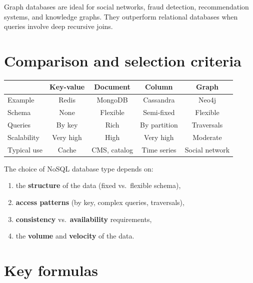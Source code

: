 \begin{remark}
Graph databases are ideal for social networks, fraud detection,
recommendation systems, and knowledge graphs. They outperform relational
databases when queries involve deep recursive joins.
\end{remark}

\section{Comparison and selection criteria}

\begin{center}
\begin{tabular}{lcccc}
\hline
& \textbf{Key-value} & \textbf{Document} & \textbf{Column} & \textbf{Graph} \\
\hline
Example     & Redis    & MongoDB    & Cassandra & Neo4j \\
Schema      & None     & Flexible   & Semi-fixed & Flexible \\
Queries     & By key   & Rich       & By partition & Traversals \\
Scalability & Very high & High      & Very high & Moderate \\
Typical use & Cache    & CMS, catalog & Time series & Social network \\
\hline
\end{tabular}
\end{center}

\begin{proposition}
The choice of NoSQL database type depends on:
\begin{enumerate}
  \item the \textbf{structure} of the data (fixed vs.\ flexible schema),
  \item \textbf{access patterns} (by key, complex queries, traversals),
  \item \textbf{consistency} vs.\ \textbf{availability} requirements,
  \item the \textbf{volume} and \textbf{velocity} of the data.
\end{enumerate}
\end{proposition}

\section{Key formulas}

